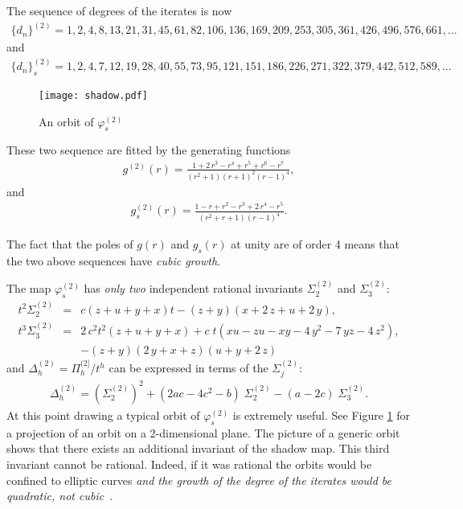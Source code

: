\documentclass[reqno]{amsart}
\numberwithin{equation}{section}
\numberwithin{figure}{section}
\begin{document}
The sequence of degrees of the iterates is now
\begin{eqnarray*}
  \{d_n\}^{(2)} = 1,2,4,8,13,21,31,45,61,82,106,136,169,209,253, 305,361, 426
  , 496, 576, 661,    \dots 
\end{eqnarray*}
and
\begin{eqnarray*}
  \{d_n\}_s^{(2)} = 1 , 2, 4, 7, 12, 19, 28, 40, 55, 73, 95, 121, 151, 
  186, 226, 271, 322, 379, 442, 512, 589,  \dots
\end{eqnarray*}
\begin{figure}[H]
\texttt{[image: shadow.pdf]}
\caption{An orbit of  $\varphi_s^{(2)}$}
\label{fig2}
\end{figure}
These two sequence are fitted by the generating functions
\begin{eqnarray}
g^{(2)}(r) =  {\frac { 1  +2\,r^3 - r^4 + r^5 + r^6 - r^7 }{ \left( {r}^{2}
+1 \right)  \left( r+1 \right) ^{2} \left( r-1 \right) ^{4}}},
\end{eqnarray}
 and
\begin{eqnarray}
g^{(2)}_s(r) = {\frac {1 - r + r^2 - r^3 + 2\,r^4 -r^5}{ \left( {r}^{2}+r+1
 \right)  \left( r-1 \right) ^{4}}}.
\end{eqnarray}

The fact that the poles of $g(r)$ and $g_s(r)$ at unity are of order 4
means that the two above sequences have {\em cubic growth}.

The  map  $\varphi_s^{(2)}$  has {\em only two} independent rational invariants
$\Sigma_2^{(2)}$ and $\Sigma_3^{(2)}$:
\begin{eqnarray*}
t^2 \Sigma_2^{(2)}& =&  c \left( z+u+y+x \right) t- \left( z+y \right)  \left( x+2\,z +u+2\,y \right),
\\
t^3 \Sigma_3^{(2)} &=& 2\,{c}^{2} t^2 \left( z+u+y+x \right) 
+c\; t \left( xu-zu-xy-4 \,{y}^{2}-7\,yz-4\,{z}^{2} \right) , \\
&& 
-  \left( z+y \right)  \left( 2\,y+x+z \right)  
\left( u+y+2\,z \right) 
\end{eqnarray*}
and $\Delta_h^{(2)}=\Pi_h^{(2]}/t^h$ can be expressed in terms of the
  $\Sigma_j^{(2)}$:
\begin{eqnarray}
\Delta_h^{(2)} = (\Sigma_2^{(2)})^2 + ( 2ac-4c^2-b) \; \Sigma_2^{(2)} 
- (a-2c)\; \Sigma_3^{(2)}.
\end{eqnarray}
At this point drawing a typical orbit of $\varphi_s^{(2)}$ is
extremely useful. See Figure \ref{fig2} for a projection of an orbit
on a 2-dimensional plane.  The picture of a generic orbit shows that
there exists an additional invariant of the shadow map.  This third
invariant cannot be rational. Indeed, if it was rational the orbits
would be confined to elliptic curves {\em and the growth of the degree
  of the iterates would be quadratic, not cubic}~\cite{Be99,Gi80}.
\end{document}
